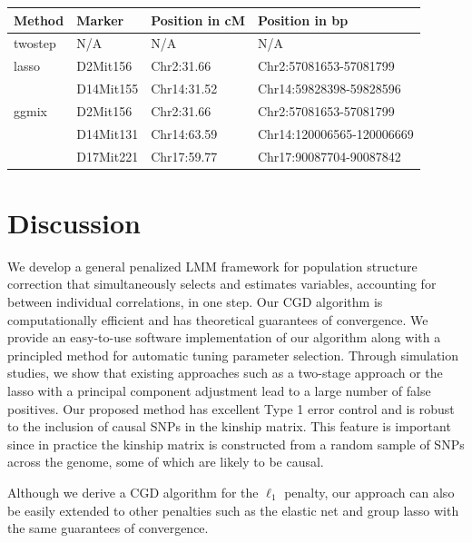 \documentclass[12pt,letter]{article}\usepackage[]{graphicx}\usepackage[]{color}
\begin{document}
\begin{minipage}{\linewidth}
\bigskip
{} \label{tab:Marker}
\begin{tabular}{ C{1.25in} C{.85in} C{1.25in} C{2.5in}}\toprule[1.5pt]
\bf Method & \bf Marker & \bf Position in cM & \bf Position in bp\\\midrule
twostep & N/A & N/A & N/A\\
lasso & D2Mit156 & Chr2:31.66 & Chr2:57081653-57081799\\
& D14Mit155 & Chr14:31.52 & Chr14:59828398-59828596\\
ggmix & D2Mit156 & Chr2:31.66 & Chr2:57081653-57081799\\
& D14Mit131 & Chr14:63.59 & Chr14:120006565-120006669\\
& D17Mit221 & Chr17:59.77 & Chr17:90087704-90087842\\
\bottomrule[1.25pt]
\end {tabular}\par
\bigskip
\end{minipage}

\section{Discussion}

We develop a general penalized LMM framework for population structure correction that simultaneously selects and estimates variables, accounting for between individual correlations, in one step.
Our CGD algorithm is computationally efficient and has theoretical guarantees of convergence.
We provide an easy-to-use software implementation of our algorithm along with a principled method for automatic tuning parameter selection.
Through simulation studies, we show that existing approaches such as a two-stage approach or the lasso with a principal component adjustment lead to a large number of false positives.
Our proposed method has excellent Type 1 error control and is robust to the inclusion of causal SNPs in the kinship matrix. This feature is important since in practice the kinship matrix is constructed from a random sample of SNPs across the genome, some of which are likely to be causal.

Although we derive a CGD algorithm for the $\ell_1$ penalty, our approach can also be easily extended to other penalties such as the elastic net and group lasso with the same guarantees of convergence.
\end{document}
